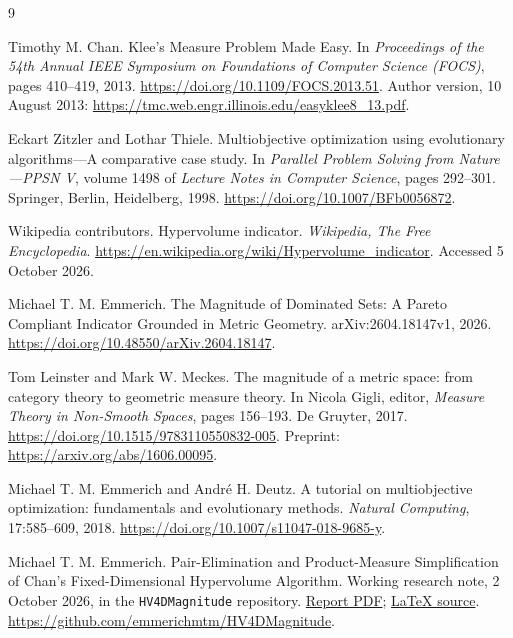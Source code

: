 \documentclass[12pt,a4paper]{article}
\theoremstyle{definition}
\begin{document}
\clearpage


\clearpage
\begin{thebibliography}{9}
\raggedright
{}
Timothy M. Chan.
\newblock Klee's Measure Problem Made Easy.
\newblock In \emph{Proceedings of the 54th Annual IEEE Symposium on
Foundations of Computer Science (FOCS)}, pages 410--419, 2013.
\newblock \url{https://doi.org/10.1109/FOCS.2013.51}.
\newblock Author version, 10 August 2013:
\url{https://tmc.web.engr.illinois.edu/easyklee8_13.pdf}.

Eckart Zitzler and Lothar Thiele.
\newblock Multiobjective optimization using evolutionary algorithms---A
comparative case study.
\newblock In \emph{Parallel Problem Solving from Nature---PPSN V},
volume 1498 of \emph{Lecture Notes in Computer Science}, pages 292--301.
Springer, Berlin, Heidelberg, 1998.
\newblock \url{https://doi.org/10.1007/BFb0056872}.

Wikipedia contributors.
\newblock Hypervolume indicator.
\newblock \emph{Wikipedia, The Free Encyclopedia}.
\newblock \url{https://en.wikipedia.org/wiki/Hypervolume_indicator}.
Accessed 5 October 2026.

Michael T. M. Emmerich.
\newblock The Magnitude of Dominated Sets: A Pareto Compliant Indicator
Grounded in Metric Geometry.
\newblock arXiv:2604.18147v1, 2026.
\newblock \url{https://doi.org/10.48550/arXiv.2604.18147}.

Tom Leinster and Mark W. Meckes.
\newblock The magnitude of a metric space: from category theory to
geometric measure theory.
\newblock In Nicola Gigli, editor, \emph{Measure Theory in Non-Smooth
Spaces}, pages 156--193. De Gruyter, 2017.
\newblock \url{https://doi.org/10.1515/9783110550832-005}.
\newblock Preprint: \url{https://arxiv.org/abs/1606.00095}.

Michael T. M. Emmerich and Andr\'e H. Deutz.
\newblock A tutorial on multiobjective optimization: fundamentals and
evolutionary methods.
\newblock \emph{Natural Computing}, 17:585--609, 2018.
\newblock \url{https://doi.org/10.1007/s11047-018-9685-y}.

Michael T. M. Emmerich.
\newblock Pair-Elimination and Product-Measure Simplification of
Chan's Fixed-Dimensional Hypervolume Algorithm.
\newblock Working research note, 2 October 2026, in the
\texttt{HV4DMagnitude} repository.
\newblock \href{https://github.com/emmerichmtm/HV4DMagnitude/blob/main/paper/magnitude_chan_pair_elimination_report.pdf}{Report PDF};
\href{https://github.com/emmerichmtm/HV4DMagnitude/blob/main/paper/magnitude_chan_pair_elimination_report.tex}{LaTeX source}.
\newblock \url{https://github.com/emmerichmtm/HV4DMagnitude}.


\end{thebibliography}
\end{document}
